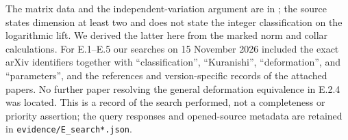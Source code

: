 The matrix data and the independent-variation argument are in
\cite[Proposition 4.2 and Proposition 6.4]{ViaTwo26push}; the
source states dimension at least two and does not state the
integer classification on the logarithmic lift.  We derived
the latter here from the marked norm and collar calculations.
For E.1--E.5 our searches on 15 November 2026 included the
exact arXiv identifiers together with ``classification'',
``Kuranishi'', ``deformation'', and ``parameters'', and the
references and version-specific records of the attached
papers.  No further paper resolving the general deformation
equivalence in E.2.4 was located.  This is a record of the
search performed, not a completeness or priority assertion;
the query responses and opened-source metadata are retained
in \texttt{evidence/E\_search*.json}.
